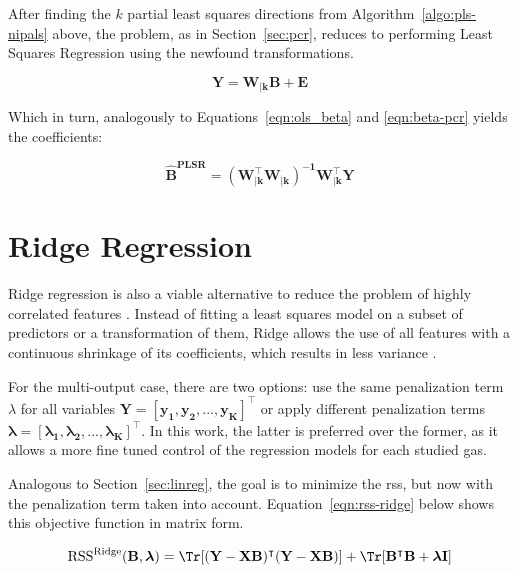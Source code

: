 After finding the $k$ partial least squares directions from Algorithm~\ref{algo:pls-nipals} above, the problem, as in Section~\ref{sec:pcr}, reduces to performing Least Squares Regression using the newfound transformations.

	\begin{equation}
	\label{eqn:plsr}
	\mathbf{Y = W_{|k} B + E}
\end{equation}

Which in turn, analogously to Equations~\ref{eqn:ols_beta} and \ref{eqn:beta-pcr} yields the coefficients:

\begin{equation}
	\label{eqn:beta-plsr}
	\mathbf{\hat{B}^{\text{PLSR}} = (W_{|k}^\intercal W_{|k})^{-1}W_{|k}^\intercal Y}
\end{equation}



\section{Ridge Regression}
\label{sec:ridge}

Ridge regression is also a viable alternative to reduce the problem of highly correlated features \parencite{friedman2001}. Instead of fitting a least squares model on a subset of predictors or a transformation of them, Ridge allows the use of all features with a continuous shrinkage of its coefficients, which results in less variance \parencite{friedman2001}.

For the multi-output case, there are two options: use the same penalization term $\lambda$ for all variables $\mathbf{Y = [y_1, y_2, ... , y_K]^\intercal}$ or apply different penalization terms $\mathbf{\boldsymbol{\lambda} = [\lambda_1, \lambda_2, ... , \lambda_K]^\intercal}$. In this work, the latter is preferred over the former, as it allows a more fine tuned control of the regression models for each studied gas.

Analogous to Section~\ref{sec:linreg}, the goal is to minimize the \acrshort{rss}, but now with the penalization term taken into account. Equation~\ref{eqn:rss-ridge} below shows this objective function in matrix form.

\begin{equation} 
	\label{eqn:rss-ridge}
	\text{RSS}^{\text{Ridge}}(\mathbf{B, \boldsymbol{\lambda} }) = \Tr [\mathbf{(Y-XB)^\intercal (Y-XB)}] + \Tr[\mathbf{B^\intercal B + \boldsymbol{\lambda} I}]
\end{equation}

